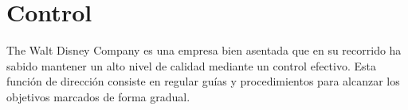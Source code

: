 \section{Control}
The Walt Disney Company es una empresa bien asentada que en su recorrido ha sabido mantener un alto nivel de calidad mediante un control efectivo. Esta función de dirección consiste en regular guías y procedimientos para alcanzar los objetivos marcados de forma gradual. 
